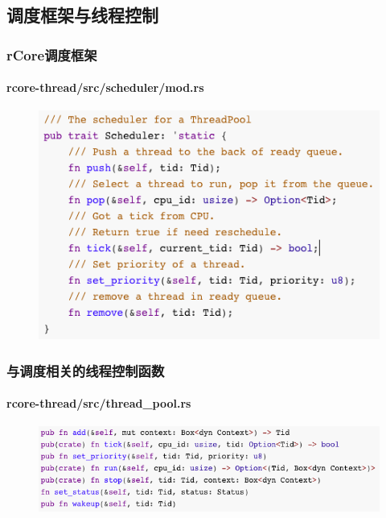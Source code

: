 \subsection{调度框架与线程控制} %
\begin{frame}[fragile]
    \frametitle{rCore调度框架}
    \framesubtitle{rcore-thread/src/scheduler/mod.rs}
    \begin{figure}
    \includegraphics[width=0.8\linewidth]{figs/Scheduler.png}
    \end{figure}
\end{frame}
% 
% 
% 
% 
\begin{frame}[fragile]
    \frametitle{与调度相关的线程控制函数}
    \framesubtitle{rcore-thread/src/thread_pool.rs}
    \begin{figure}
    \includegraphics[width=0.8\linewidth]{figs/thread-pool-scheduler.png}
    \end{figure}
\end{frame}
